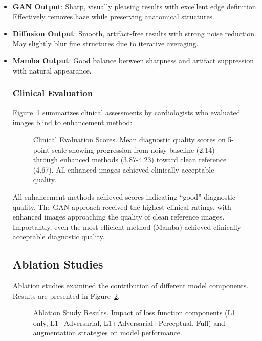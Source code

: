 \documentclass[10pt,conference,letterpaper]{IEEEtran}
\begin{document}
\begin{itemize}
  \item \textbf{GAN Output}: Sharp, visually pleasing results with excellent edge definition. Effectively removes haze while preserving anatomical structures.
  
  \item \textbf{Diffusion Output}: Smooth, artifact-free results with strong noise reduction. May slightly blur fine structures due to iterative averaging.
  
  \item \textbf{Mamba Output}: Good balance between sharpness and artifact suppression with natural appearance.

\subsubsection{Clinical Evaluation}

Figure~\ref{fig:clinical_eval} summarizes clinical assessments by cardiologists who evaluated images blind to enhancement method:

\begin{figure}[H]
  \centering
  \fbox{\rule{0pt}{3cm}\rule{4.5cm}{0pt}}
  \caption{Clinical Evaluation Scores. Mean diagnostic quality scores on 5-point scale showing progression from noisy baseline (2.14) through enhanced methods (3.87-4.23) toward clean reference (4.67). All enhanced images achieved clinically acceptable quality.}
  \label{fig:clinical_eval}
\end{figure}

All enhancement methods achieved scores indicating ``good'' diagnostic quality. The GAN approach received the highest clinical ratings, with enhanced images approaching the quality of clean reference images. Importantly, even the most efficient method (Mamba) achieved clinically acceptable diagnostic quality.

\subsection{Ablation Studies}

Ablation studies examined the contribution of different model components. Results are presented in Figure~\ref{fig:ablation}.

\begin{figure}[H]
  \centering
  \fbox{\rule{0pt}{3cm}\rule{4.5cm}{0pt}}
  \caption{Ablation Study Results. Impact of loss function components (L1 only, L1+Adversarial, L1+Adversarial+Perceptual, Full) and augmentation strategies on model performance.}
  \label{fig:ablation}
\end{figure}


\end{itemize}
\end{document}
